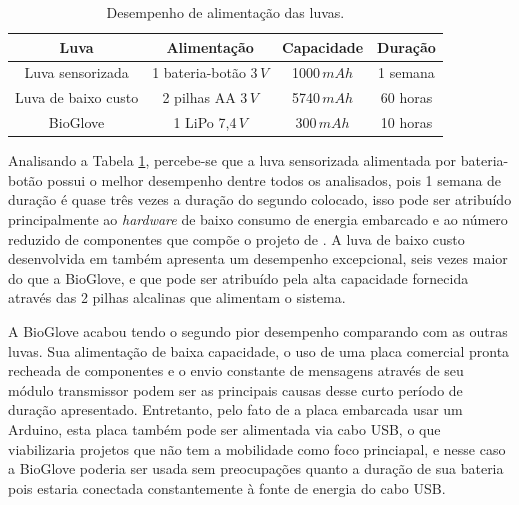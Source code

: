 \documentclass[
	12pt,				%
	openright,			%
	oneside,			%
	a4paper,			%
	english,			%
	brazil				%
	]{abntex2}
\begin{document}
		\begin{table}[H]
  	\centering
		\caption{Desempenho de alimentação das luvas.}
    \begin{tabular}{c|c|c|c}
      \midrule
			Luva 								& Alimentação							&	Capacidade	& Duração	\\
      \midrule                                            					
			Luva sensorizada 		& 1 bateria-botão	3$\,V$	& 1000$\,mAh$		& 1 semana\\
			Luva de baixo custo & 2 pilhas AA 3$\,V$			& 5740$\,mAh$		& 60 horas\\
			BioGlove						& 1 LiPo 7,4$\,V$					& 300$\,mAh$			&	10 horas\\	
      \midrule
    \end{tabular}
		\label{Tab:battery-range}
		\end{table}

		Analisando a Tabela \ref{Tab:battery-range}, percebe-se que a luva sensorizada alimentada por bateria-botão possui o melhor desempenho dentre todos os analisados, pois 1 semana de duração é quase três vezes a duração do segundo colocado, isso pode ser atribuído principalmente ao \textit{hardware} de baixo consumo de energia embarcado e ao número reduzido de componentes que compõe o projeto de \cite{michela2013rehab}. A luva de baixo custo desenvolvida em \cite{simone2007lowcost} também apresenta um desempenho excepcional, seis vezes maior do que a BioGlove, e que pode ser atribuído pela alta capacidade fornecida através das 2 pilhas alcalinas que alimentam o sistema.


		A BioGlove acabou tendo o segundo pior desempenho comparando com as outras luvas. Sua alimentação de baixa capacidade, o uso de uma placa comercial pronta recheada de componentes e o envio constante de mensagens através de seu módulo transmissor podem ser as principais causas desse curto período de duração apresentado. Entretanto, pelo fato de a placa embarcada usar um Arduino, esta placa também pode ser alimentada via cabo USB, o que viabilizaria projetos que não tem a mobilidade como foco princiapal, e nesse caso a BioGlove poderia ser usada sem preocupações quanto a duração de sua bateria pois estaria conectada constantemente à fonte de energia do cabo USB.
\end{document}
